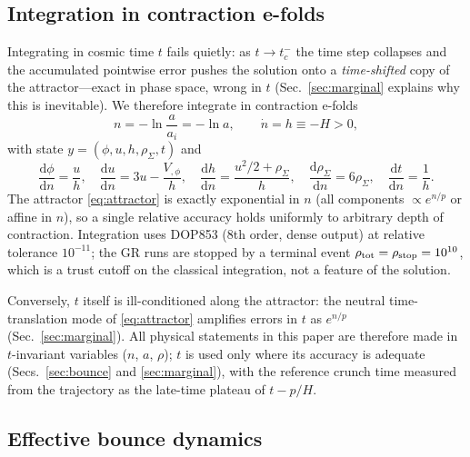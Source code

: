 \documentclass[11pt,a4paper]{article}
\newcommand{\dd}{\mathrm{d}}
\newcommand{\rhoSigma}{\rho_\Sigma}
\begin{document}
\subsection{Integration in contraction e-folds}

Integrating in cosmic time $t$ fails quietly: as $t\to t_c^{-}$ the time
step collapses and the accumulated pointwise error pushes the solution onto
a \emph{time-shifted} copy of the attractor---exact in phase space, wrong
in $t$ (Sec.~\ref{sec:marginal} explains why this is inevitable). We
therefore integrate in contraction e-folds
\begin{equation}
  n=-\ln\!\frac{a}{a_i}=-\ln a,\qquad \dot n = h\equiv -H>0 ,
  \label{eq:efolds}
\end{equation}
with state $y=(\phi,u,h,\rhoSigma,t)$ and
\begin{equation}
  \frac{\dd\phi}{\dd n}=\frac{u}{h},\quad
  \frac{\dd u}{\dd n}=3u-\frac{V_{,\phi}}{h},\quad
  \frac{\dd h}{\dd n}=\frac{u^2/2+\rhoSigma}{h},\quad
  \frac{\dd\rhoSigma}{\dd n}=6\rhoSigma,\quad
  \frac{\dd t}{\dd n}=\frac{1}{h}.
  \label{eq:system-n}
\end{equation}
The attractor \eqref{eq:attractor} is exactly exponential in $n$ (all
components $\propto e^{n/p}$ or affine in $n$), so a single relative
accuracy holds uniformly to arbitrary depth of contraction. Integration
uses DOP853 (8th order, dense output) at relative tolerance $10^{-11}$; the
GR runs are stopped by a terminal event
$\rho_{\rm tot}=\rho_{\rm stop}=10^{10}$, which is a trust cutoff on the
classical integration, not a feature of the solution.

Conversely, $t$ itself is ill-conditioned along the attractor: the neutral
time-translation mode of \eqref{eq:attractor} amplifies errors in $t$ as
$e^{n/p}$ (Sec.~\ref{sec:marginal}). All physical statements in this paper
are therefore made in $t$-invariant variables ($n$, $a$, $\rho$); $t$ is
used only where its accuracy is adequate (Secs.~\ref{sec:bounce} and
\ref{sec:marginal}), with the reference crunch time measured from the
trajectory as the late-time plateau of $t-p/H$.

\subsection{Effective bounce dynamics}
\label{sec:eff}
\end{document}
